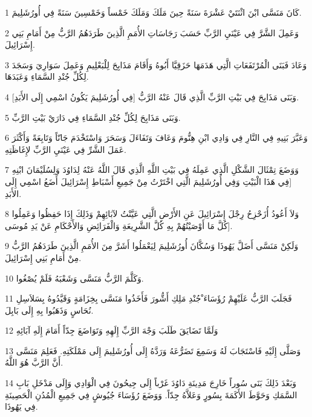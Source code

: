 \par 1 كَانَ مَنَسَّى ابْنَ اثْنَتَيْ عَشْرَةَ سَنَةً حِينَ مَلَكَ وَمَلَكَ خَمْساً وَخَمْسِينَ سَنَةً فِي أُورُشَلِيمَ.
\par 2 وَعَمِلَ الشَّرَّ فِي عَيْنَيِ الرَّبِّ حَسَبَ رَجَاسَاتِ الأُمَمِ الَّذِينَ طَرَدَهُمُ الرَّبُّ مِنْ أَمَامِ بَنِي إِسْرَائِيلَ.
\par 3 وَعَادَ فَبَنَى الْمُرْتَفَعَاتِ الَّتِي هَدَمَهَا حَزَقِيَّا أَبُوهُ وَأَقَامَ مَذَابِحَ لِلْبَعْلِيمِ وَعَمِلَ سَوَارِيَ وَسَجَدَ لِكُلِّ جُنْدِ السَّمَاءِ وَعَبَدَهَا.
\par 4 وَبَنَى مَذَابِحَ فِي بَيْتِ الرَّبِّ الَّذِي قَالَ عَنْهُ الرَّبُّ [فِي أُورُشَلِيمَ يَكُونُ اسْمِي إِلَى الأَبَدِ].
\par 5 وَبَنَى مَذَابِحَ لِكُلِّ جُنْدِ السَّمَاءِ فِي دَارَيْ بَيْتِ الرَّبِّ.
\par 6 وَعَبَّرَ بَنِيهِ فِي النَّارِ فِي وَادِي ابْنِ هِنُّومَ وَعَافَ وَتَفَاءَلَ وَسَحَرَ وَاسْتَخْدَمَ جَانّاً وَتَابِعَةً وَأَكْثَرَ عَمَلَ الشَّرِّ فِي عَيْنَيِ الرَّبِّ لإِغَاظَتِهِ.
\par 7 وَوَضَعَ تِمْثَالَ الشَّكْلِ الَّذِي عَمِلَهُ فِي بَيْتِ اللَّهِ الَّذِي قَالَ اللَّهُ عَنْهُ لِدَاوُدَ وَلِسُلَيْمَانَ ابْنِهِ [فِي هَذَا الْبَيْتِ وَفِي أُورُشَلِيمَ الَّتِي اخْتَرْتُ مِنْ جَمِيعِ أَسْبَاطِ إِسْرَائِيلَ أَضَعُ اسْمِي إِلَى الأَبَدِ.
\par 8 وَلاَ أَعُودُ أُزَحْزِحُ رِجْلَ إِسْرَائِيلَ عَنِ الأَرْضِ الَّتِي عَيَّنْتُ لآبَائِهِمْ وَذَلِكَ إِذَا حَفِظُوا وَعَمِلُوا كُلَّ مَا أَوْصَيْتُهُمْ بِهِ كُلَّ الشَّرِيعَةِ وَالْفَرَائِضِ وَالأَحْكَامِ عَنْ يَدِ مُوسَى].
\par 9 وَلَكِنْ مَنَسَّى أَضَلَّ يَهُوذَا وَسُكَّانَ أُورُشَلِيمَ لِيَعْمَلُوا أَشَرَّ مِنَ الأُمَمِ الَّذِينَ طَرَدَهُمُ الرَّبُّ مِنْ أَمَامِ بَنِي إِسْرَائِيلَ.
\par 10 وَكَلَّمَ الرَّبُّ مَنَسَّى وَشَعْبَهُ فَلَمْ يُصْغُوا.
\par 11 فَجَلَبَ الرَّبُّ عَلَيْهِمْ رُؤَسَاءَ ْجُنْدِ مَلِكِ أَشُّورَ فَأَخَذُوا مَنَسَّى بِخِزَامَةٍ وَقَيَّدُوهُ بِسَلاَسِلِ نُحَاسٍ وَذَهَبُوا بِهِ إِلَى بَابِلَ.
\par 12 وَلَمَّا تَضَايَقَ طَلَبَ وَجْهَ الرَّبِّ إِلَهِهِ وَتَوَاضَعَ جِدّاً أَمَامَ إِلَهِ آبَائِهِ
\par 13 وَصَلَّى إِلَيْهِ فَاسْتَجَابَ لَهُ وَسَمِعَ تَضَرُّعَهُ وَرَدَّهُ إِلَى أُورُشَلِيمَ إِلَى مَمْلَكَتِهِ. فَعَلِمَ مَنَسَّى أَنَّ الرَّبَّ هُوَ اللَّهُ.
\par 14 وَبَعْدَ ذَلِكَ بَنَى سُوراً خَارِجَ مَدِينَةِ دَاوُدَ غَرْباً إِلَى جِيحُونَ فِي الْوَادِي وَإِلَى مَدْخَلِ بَابِ السَّمَكِ وَحَوَّطَ الأَكَمَةَ بِسُورٍ وَعَلاَّهُ جِدّاً. وَوَضَعَ رُؤَسَاءَ جُيُوشٍ فِي جَمِيعِ الْمُدُنِ الْحَصِينَةِ فِي يَهُوذَا.
